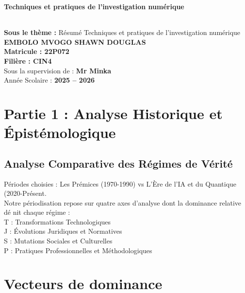 \documentclass[12pt]{article}
\begin{document}
\vspace{2cm}

\begin{center} 
	\colorbox{orange!80}{
        \parbox{\dimexpr\textwidth-4\fboxsep}{
            \centering
            {\LARGE \textbf{Techniques et pratiques de l'investigation numérique}}
        }
    }\\[0.8cm]
    {\large \textbf{Sous le thème :} Résumé Techniques et pratiques de l'investigation numérique}\\[1.5cm]

    \textbf{{EMBOLO MVOGO SHAWN DOUGLAS}}\\[0.8cm]
    \textbf{{Matricule : 22P072}}\\[0.8cm]
    \textbf{{Filière : CIN4}}\\[0.8cm]
    Sous la supervision de : \textbf{Mr Minka}\\[1.5cm]

    Année Scolaire : \textbf{2025 -- 2026}
\end{center}


\newpage
\setcounter{page}{1}

\newpage

\section{ Partie 1 : Analyse Historique et Épistémologique}

\subsection{ Analyse Comparative des Régimes de Vérité}

Périodes choisies : Les Prémices (1970-1990) vs L'Ère de l'IA et du Quantique (2020-Présent. \\ Notre périodisation repose sur quatre axes d'analyse dont la dominance
 relative dé nit chaque régime :\\
 T : Transformations Technologiques\\
 J : Évolutions Juridiques et Normatives\\
 S : Mutations Sociales et Culturelles\\
 P : Pratiques Professionnelles et Méthodologiques\\
 

\section*{Vecteurs de dominance}
\end{document}
